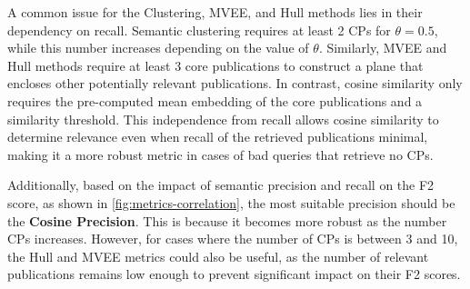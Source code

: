 A common issue for the Clustering, MVEE, and Hull methods lies in their dependency on recall. Semantic clustering requires at least 2 CPs for $\theta=0.5$, while this number increases depending on the value of $\theta$. Similarly, MVEE and Hull methods require at least 3 core publications to construct a plane that encloses other potentially relevant publications. In contrast, cosine similarity only requires the pre-computed mean embedding of the core publications and a similarity threshold. This independence from recall allows cosine similarity to determine relevance even when recall of the retrieved publications minimal, making it a more robust metric in cases of bad queries that retrieve no CPs.

Additionally, based on the impact of semantic precision and recall on the F2 score, as shown in \autoref{fig:metrics-correlation}, the most suitable precision should be the \textbf{Cosine Precision}. This is because it becomes more robust as the number CPs increases. However, for cases where the number of CPs is between 3 and 10, the Hull and MVEE metrics could also be useful, as the number of relevant publications remains low enough to prevent significant impact on their F2 scores.






